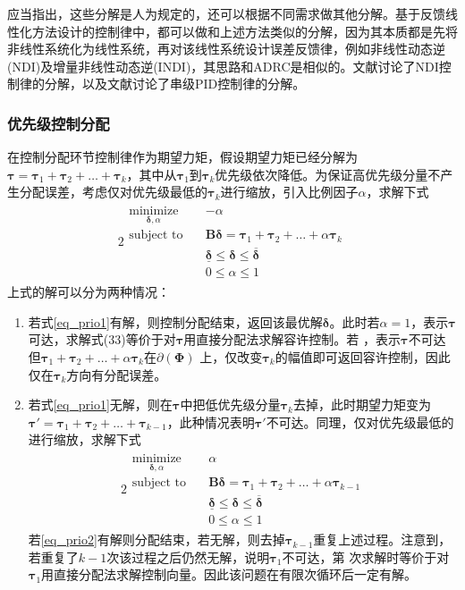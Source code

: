 应当指出，这些分解是人为规定的，还可以根据不同需求做其他分解。基于反馈线性化方法设计的控制律中，都可以做和上述方法类似的分解，因为其本质都是先将非线性系统化为线性系统，再对该线性系统设计误差反馈律，例如非线性动态逆(NDI)及增量非线性动态逆\cite{Wang_2019}(INDI)，其思路和ADRC是相似的。文献\parencite{Smeur_2017,Buffington_1997}讨论了NDI控制律的分解，以及文献\parencite{Yu_2015}讨论了串级PID控制律的分解。
%
\subsubsection{优先级控制分配}
%
在控制分配环节控制律作为期望力矩，假设期望力矩已经分解为$\bm{\tau}=\bm{\tau}_1+\bm{\tau}_2+\ldots+\bm{\tau}_k$，其中从$\bm{\tau}_1$到$\bm{\tau}_k$优先级依次降低。为保证高优先级分量不产生分配误差，考虑仅对优先级最低的$\bm{\tau}_k$进行缩放，引入比例因子$\alpha$，求解下式
\begin{alignat}{2}
\begin{split}
\mathop {{\text{minimize}}}\limits_{\bm{\delta},\alpha}\quad&{-\alpha} \\
\mbox{subject to}\quad
&\bm{B}\bm{\delta}=\bm{\tau}_1+\bm{\tau}_2+\ldots+\alpha\bm{\tau}_k \\
&\underline{\bm{\delta}} \leq \bm{\delta} \leq \overline{\bm{\delta}} \\
&0 \leq \alpha \leq 1
\end{split} \label{eq_prio1}
\end{alignat}	
上式的解可以分为两种情况：
\begin{enumerate}
	\item 若式\eqref{eq_prio1}有解，则控制分配结束，返回该最优解$\bm{\delta}$。此时若$\alpha=1$，表示$\bm{\tau}$可达，求解式(33)等价于对$\bm{\tau}$用直接分配法求解容许控制。若 ，表示$\bm{\tau}$不可达但$\bm{\tau}_1+\bm{\tau}_2+\ldots+\alpha \bm{\tau}_k $在$\partial(\bm{\Phi})$ 上，仅改变$\bm{\tau}_k$的幅值即可返回容许控制，因此仅在$\bm{\tau}_k$方向有分配误差。
	\item 若式\eqref{eq_prio1}无解，则在$\bm{\tau}$中把低优先级分量$\bm{\tau}_k$去掉，此时期望力矩变为$\bm{\tau '}=\bm{\tau}_1+\bm{\tau}_2+\ldots+\bm{\tau}_{k-1}$，此种情况表明$\bm{\tau '}$不可达。同理，仅对优先级最低的 进行缩放，求解下式
	\begin{alignat}{2}
	\begin{split}
	\mathop {{\text{minimize}}}\limits_{\bm{\delta},\alpha}\quad&{\alpha} \\
	\mbox{subject to}\quad
	&\bm{B}\bm{\delta}=\bm{\tau}_1+\bm{\tau}_2+\ldots+\alpha\bm{\tau}_{k-1} \\
	&\underline{\bm{\delta}} \leq \bm{\delta} \leq \overline{\bm{\delta}} \\
	&0 \leq \alpha \leq 1
	\end{split} \label{eq_prio2}
	\end{alignat}	
	若\eqref{eq_prio2}有解则分配结束，若无解，则去掉$\bm{\tau}_{k-1}$重复上述过程。注意到，若重复了$k-1$次该过程之后仍然无解，说明$\bm{\tau}_{1}$不可达，第 次求解时等价于对$\bm{\tau}_{1}$用直接分配法求解控制向量。因此该问题在有限次循环后一定有解。
\end{enumerate}	

